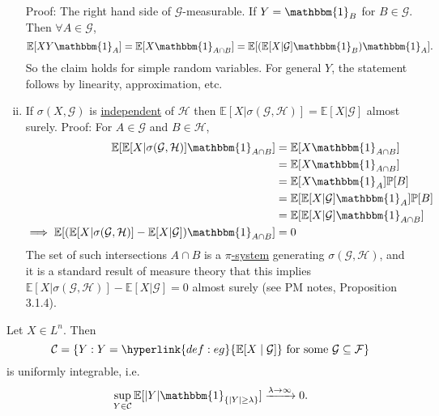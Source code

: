 \documentclass{article}
\newcommand{\F}{\mathcal{F}}
\newcommand{\G}{\mathcal{G}}
\newcommand{\1}[1]{\mathbbm{1}_{#1}}
\newcommand{\Prob}{\mathbb{P}}
\newcommand{\E}{\mathbb{E}}
\begin{document}
\begin{enumerate}[(i)]
    Proof: The right hand side of $\G$-measurable. If $Y = \1B$ for $B \in \G$. Then $\forall A \in \G$,
    \begin{equation*}
      \E[XY \1A] = \E[X \1{A\cap B}] = \E[(\E[X | \G] \1B) \1A]
    .\end{equation*}
    So the claim holds for simple random variables. For general $Y$, the statement follows by linearity, approximation, etc.
  \item If $\sigma(X, \G)$ is \hyperlink{def:indep}{independent} of $\mathcal{H}$ then $\E[X | \sigma(\G,\mathcal{H})] = \E[X | \G]$ almost surely.
    Proof: For $A \in \G$ and $B \in \mathcal{H}$,
    \begin{align*}
      \E[\E[X | \sigma(\G,\mathcal{H})] \1{A \cap B}] &= \E[X \1{A \cap B}] \\
                                                      &= \E[X \1{A\cap B}] \\
                                                      &= \E[X \1A] \Prob[B] \\
                                                      &= \E[\E[X | \G] \1A] \Prob[B] \\
                                                      &= \E[\E[X | \G] \1{A \cap B}]\\
      \implies \E[(\E[X | \sigma(\G,\mathcal{H})] - \E[X | \G]) \1{A \cap B}] &= 0
    \end{align*}
    The set of such intersections $A \cap B$ is a \hyperlink{def:pisystem}{$\pi$-system} generating $\sigma(\G, \mathcal{H})$, and it is a standard result of measure theory that this implies $\E[X | \sigma(\G, \mathcal{H})] - \E[X | \G] = 0$ almost surely (see PM notes, Proposition 3.1.4).
\end{enumerate}
\begin{nlemma}\label{lem:1.5}
  \newlec
  Let $X \in L^n$. Then
  \begin{equation*}
    \mathcal{C} = \{Y : Y = \hyperlink{def:eg}{\E[X \mid \G]} \text{ for some } \G \subseteq \F\}
  \end{equation*}
  is uniformly integrable, i.e.\
  \begin{equation*}
    \sup_{Y \in \mathcal{C}} \E[|Y| \1{\{|Y| \geq \lambda\}}] \xrightarrow{\lambda \to \infty} 0
  .\end{equation*}
\end{nlemma}
\end{document}
